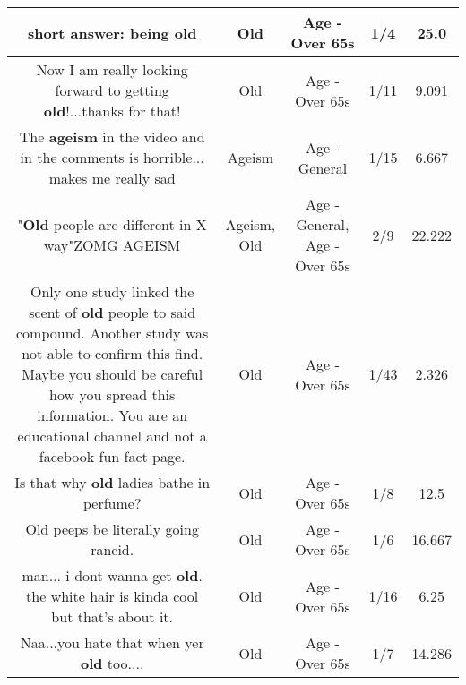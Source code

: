\documentclass[11pt]{article}
\newlength\mylength
\begin{document}
\begin{center}
\begin{longtable}{|C{.65\mylength}|C{.30\mylength}|C{.12\mylength}|C{.12\mylength}|C{.12\mylength}|}
  \small short answer: being old\normalsize   & Old & Age - Over 65s & 1/4 & 25.0 \\  \hline
  \small Now I am really looking forward to getting \textbf{old}!...thanks for that!\normalsize   & Old & Age - Over 65s & 1/11 & 9.091 \\  \hline
  \small The \textbf{ageism} in the video and in the comments is horrible... makes me really sad\normalsize   & Ageism & Age - General & 1/15 & 6.667 \\  \hline
  \small "\textbf{Old} people are different in X way"ZOMG AGEISM\normalsize   & Ageism, Old & Age - General, Age - Over 65s & 2/9 & 22.222 \\  \hline
  \small Only one study linked the scent of \textbf{old} people to said compound. Another study was not able to confirm this find. Maybe you should be careful how you spread this information. You are an educational channel and not a facebook fun fact page.\normalsize   & Old & Age - Over 65s & 1/43 & 2.326 \\  \hline
  \small Is that why \textbf{old} ladies bathe in perfume?\normalsize   & Old & Age - Over 65s & 1/8 & 12.5 \\  \hline
  \small Old peeps be literally going rancid.\normalsize   & Old & Age - Over 65s & 1/6 & 16.667 \\  \hline
  \small man... i dont wanna get \textbf{old}. the white hair is kinda cool but that's about it.\normalsize   & Old & Age - Over 65s & 1/16 & 6.25 \\  \hline
  \small Naa...you hate that when yer \textbf{old} too....\normalsize   & Old & Age - Over 65s & 1/7 & 14.286 \\  \hline

\end{longtable}
\end{center}
\end{document}
